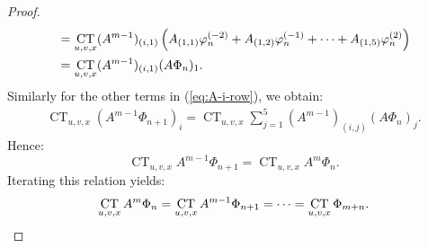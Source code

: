 \documentclass[10pt,a4paper]{amsart}
\def\CT{\mathop{\mathrm{CT}}}
\begin{document}
\begin{proof}
\begin{align}
&= \CT_{u,v,x} (A^{m-1})_{(i,1)} \left( A_{(1,1)} \varphi_{n}^{(-2)} + A_{(1,2)} \varphi_{n}^{(-1)} + \cdots + A_{(1,5)} \varphi_{n}^{(2)} \right) \notag \\
&= \CT_{u,v,x} (A^{m-1})_{(i,1)} (A \Phi_{n})_{1}. \notag
\end{align}
Similarly for the other terms in (\ref{eq:A-i-row}), we obtain:
\begin{align*}
\CT_{u,v,x} (A^{m-1} \Phi_{n+1})_{i} = \CT_{u,v,x} \sum_{j=1}^{5} (A^{m-1})_{(i,j)} (A \Phi_{n})_{j}.
\end{align*}
Hence:
\[
\CT_{u,v,x} A^{m-1} \Phi_{n+1} = \CT_{u,v,x} A^{m} \Phi_{n}.
\]
Iterating this relation yields:
\[
\CT_{u,v,x} A^{m} \Phi_{n} = \CT_{u,v,x} A^{m-1} \Phi_{n+1} = \cdots = \CT_{u,v,x} \Phi_{m+n}. \qedhere
\]
\end{proof}
\end{document}
